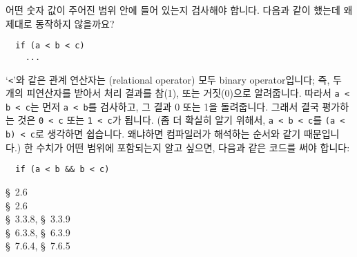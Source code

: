 
\begin{faq}
        어떤 숫자 값이 주어진 범위 안에 들어 있는지 검사해야 합니다.
        다음과 같이 했는데 왜 제대로 동작하지 않을까요?
\begin{verbatim}
  if (a < b < c)
    ...
\end{verbatim}
\A
        `\verb+<+'와 같은 관계 연산자는 (relational operator) 모두 binary
        operator입니다; 즉, 두 개의 피연산자를 받아서 처리 결과를 참(1), 
        또는 거짓(0)으로 알려줍니다. 따라서 \verb+a < b < c+는 먼저 
        \verb+a < b+를 검사하고, 그 결과 0 또는 1을 돌려줍니다. 그래서 결국
        평가하는 것은 \verb+0 < c+ 또는 \verb+1 < c+가
        됩니다. (좀 더 확실히 알기 위해서, \verb+a < b < c+를
        \verb+(a < b) < c+로 생각하면 쉽습니다. 왜냐하면 컴파일러가
        해석하는 순서와 같기 때문입니다.) 한 수치가 어떤
        범위에 포함되는지 알고 싶으면, 다음과 같은 코드를 써야 합니다:
\begin{verbatim}
  if (a < b && b < c)
\end{verbatim}
\R
        \cite{kr1} \S\ 2.6  \\
        \cite{kr2} \S\ 2.6  \\
        \cite{ansi} \S\ 3.3.8, \S\ 3.3.9 \\
        \cite{c89} \S\ 6.3.8, \S\ 6.3.9 \\
        \cite{hs} \S\ 7.6.4, \S\ 7.6.5 
\end{faq}

